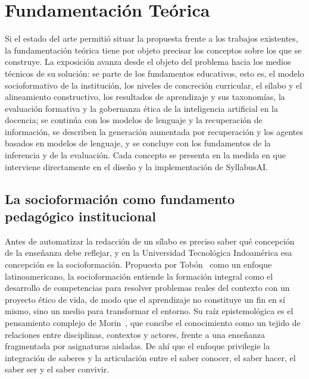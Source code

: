 \section{Fundamentación Teórica}
Si el estado del arte permitió situar la propuesta frente a los trabajos existentes, la fundamentación teórica tiene por objeto precisar los conceptos sobre los que se construye. La exposición avanza desde el objeto del problema hacia los medios técnicos de su solución: se parte de los fundamentos educativos, esto es, el modelo socioformativo de la institución, los niveles de concreción curricular, el sílabo y el alineamiento constructivo, los resultados de aprendizaje y sus taxonomías, la evaluación formativa y la gobernanza ética de la inteligencia artificial en la docencia; se continúa con los modelos de lenguaje y la recuperación de información, se describen la generación aumentada por recuperación y los agentes basados en modelos de lenguaje, y se concluye con los fundamentos de la inferencia y de la evaluación. Cada concepto se presenta en la medida en que interviene directamente en el diseño y la implementación de SyllabusAI.

\subsection{La socioformación como fundamento pedagógico institucional}
Antes de automatizar la redacción de un sílabo es preciso saber qué concepción de la enseñanza debe reflejar, y en la Universidad Tecnológica Indoamérica esa concepción es la socioformación. Propuesta por Tobón~\cite{tobon2013} como un enfoque latinoamericano, la socioformación entiende la formación integral como el desarrollo de competencias para resolver problemas reales del contexto con un proyecto ético de vida, de modo que el aprendizaje no constituye un fin en sí mismo, sino un medio para transformar el entorno. Su raíz epistemológica es el pensamiento complejo de Morin~\cite{morin1999}, que concibe el conocimiento como un tejido de relaciones entre disciplinas, contextos y actores, frente a una enseñanza fragmentada por asignaturas aisladas. De ahí que el enfoque privilegie la integración de saberes y la articulación entre el saber conocer, el saber hacer, el saber ser y el saber convivir.

